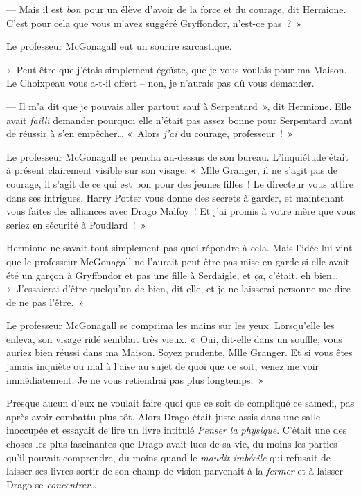 --- Mais il est \emph{bon} pour un élève d'avoir de la force et du courage, dit Hermione.
C'est pour cela que vous m'avez suggéré Gryffondor, n'est-ce pas~?~»

Le professeur McGonagall eut un sourire sarcastique.

«~Peut-être que j'étais simplement égoïste, que je vous voulais pour ma Maison.
Le Choixpeau vous a-t-il offert -- non, je n'aurais pas dû vous demander.

--- Il m'a dit que je pouvais aller partout sauf à Serpentard~», dit Hermione.
Elle avait \emph{failli} demander pourquoi elle n'était pas assez bonne pour Serpentard avant de réussir à s'en empêcher…
«~Alors \emph{j'ai} du courage, professeur~!~»

Le professeur McGonagall se pencha au-dessus de son bureau.
L'inquiétude était à présent clairement visible sur son visage.
«~Mlle Granger, il ne s'agit pas de courage, il s'agit de ce qui est bon pour des jeunes filles~!
Le directeur vous attire dans ses intrigues, Harry Potter vous donne des secrets à garder, et maintenant vous faites des alliances avec Drago Malfoy~!
Et j'ai promis à votre mère que vous seriez en sécurité à Poudlard~!~»

Hermione ne savait tout simplement pas quoi répondre à cela.
Mais l'idée lui vint que le professeur McGonagall ne l'aurait peut-être pas mise en garde si elle avait été un garçon à Gryffondor et pas une fille à Serdaigle, et \emph{ça}, c'était, eh bien…
«~J'essaierai d'être quelqu'un de bien, dit-elle, et je ne laisserai personne me dire de ne pas l'être.~»

Le professeur McGonagall se comprima les mains sur les yeux.
Lorsqu'elle les enleva, son visage ridé semblait très vieux.
«~Oui, dit-elle dans un souffle, vous auriez bien réussi dans ma Maison.
Soyez prudente, Mlle Granger.
Et si vous êtes jamais inquiète ou mal à l'aise au sujet de quoi que ce soit, venez me voir immédiatement.
Je ne vous retiendrai pas plus longtemps.~»


Presque aucun d'eux ne voulait faire quoi que ce soit de compliqué ce samedi, pas après avoir combattu plus tôt.
Alors Drago était juste assis dans une salle inoccupée et essayait de lire un livre intitulé \emph{Penser la physique}.
C'était une des choses les plus fascinantes que Drago avait lues de sa vie, du moins les parties qu'il pouvait comprendre, du moins quand le \emph{maudit imbécile} qui refusait de laisser ses livres sortir de son champ de vision parvenait à la \emph{fermer} et à laisser Drago se \emph{concentrer}…

